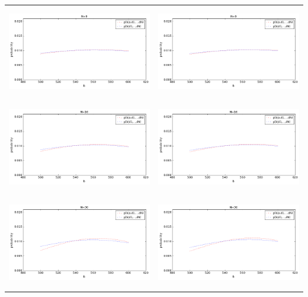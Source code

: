 \documentclass[12pt, a4paper]{article}
\begin{document}
\begin{center}
\begin{tabular}{ c  c }
                \includegraphics[width=8cm, height=4cm]{graphs/m3_ex_n9.png} &
                \includegraphics[width=8cm, height=4cm]{graphs/m4_ex_n9.png} \\
                
                \includegraphics[width=8cm, height=4cm]{graphs/m3_ex_n16.png} &
                \includegraphics[width=8cm, height=4cm]{graphs/m4_ex_n16.png} \\
                
                \includegraphics[width=8cm, height=4cm]{graphs/m3_ex_n30.png} &
                \includegraphics[width=8cm, height=4cm]{graphs/m4_ex_n30.png} \\
                

\end{tabular}
\end{center}
\end{document}

